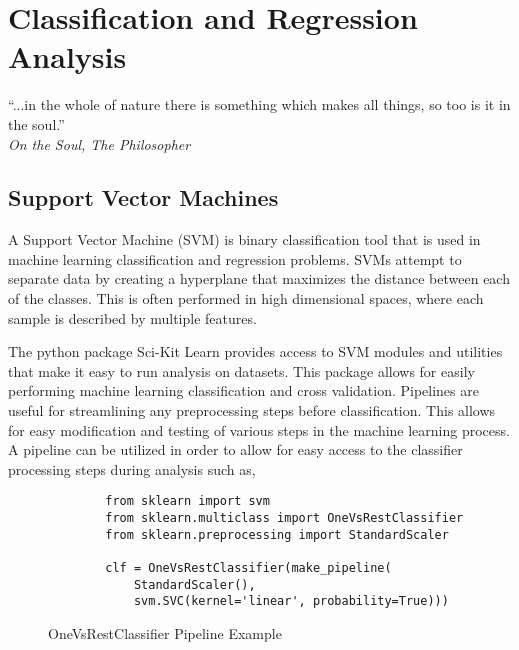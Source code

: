 \chapter{Classification and Regression Analysis}
\begin{center}
  \begin{minipage}{0.75\textwidth}
    \begin{small}
      “...in the whole of nature there is something which makes all things, so too is it in the soul.”\\
      \null\hfill\emph{On the Soul, The Philosopher}
    \end{small}
  \end{minipage}
  \vspace{0.5cm}
\end{center}

\section{Support Vector Machines}
A Support Vector Machine (SVM) is binary classification tool that is used in machine learning classification and regression problems.  SVMs attempt to separate data by creating a hyperplane that maximizes the distance between each of the classes.  This is often performed in high dimensional spaces, where each sample is described by multiple features.

The python package Sci-Kit Learn provides access to SVM modules and utilities that make it easy to run analysis on datasets.  This package allows for easily performing machine learning classification and cross validation.  Pipelines are useful for streamlining any preprocessing steps before classification.  This allows for easy modification and testing of various steps in the machine learning process.  A pipeline can be utilized in order to allow for easy access to the classifier processing steps during analysis such as,
%
\begin{figure}
    \begin{lstlisting}
        from sklearn import svm
        from sklearn.multiclass import OneVsRestClassifier
        from sklearn.preprocessing import StandardScaler

        clf = OneVsRestClassifier(make_pipeline(
            StandardScaler(),
            svm.SVC(kernel='linear', probability=True)))
    \end{lstlisting}
    \caption{OneVsRestClassifier Pipeline Example}
    \label{fig:scattering}
\end{figure}

